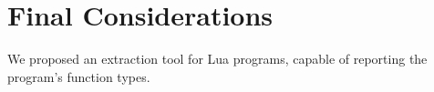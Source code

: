 \chapter{Final Considerations}
\label{cha:Final Considerations}
We proposed an extraction tool for Lua programs, capable of reporting the program's function types.

% 